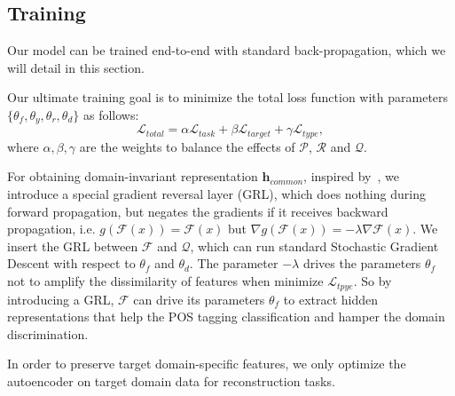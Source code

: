 \documentclass[11pt,letterpaper]{article}
\begin{document}
\subsection{Training}
Our model can be trained end-to-end with standard back-propagation, which we will detail in this section.

Our ultimate training goal is to minimize the total loss function with parameters $\{\theta_f,\theta_y,\theta_r,\theta_d\}$ as follows:
\begin{equation}
\mathcal{L}_{total} =\alpha\mathcal{L}_{task} + \beta\mathcal{L}_{target} + \gamma \mathcal{L}_{type},
\label{eq:minmax}
\end{equation}
where $\alpha,\beta,\gamma$ are the weights to balance the effects of $\mathcal{P}$, $\mathcal{R}$ and $\mathcal{Q}$.

For obtaining domain-invariant representation $\textbf{h}_{common}$, inspired by~\cite{ganin2015unsupervised}, we introduce a special gradient reversal layer (GRL), which does nothing during forward propagation, but negates the gradients if it receives backward propagation, i.e. $g(\mathcal{F}(x))=\mathcal{F}(x)$ but $\nabla g(\mathcal{F}(x))=-\lambda\nabla\mathcal{F}(x)$. We insert the GRL between $\mathcal{F}$ and $\mathcal{Q}$, which can run standard Stochastic Gradient Descent with respect to $\theta_f$ and $\theta_d$. The parameter $-\lambda$ drives the parameters $\theta_f$ not to amplify the dissimilarity of features when minimize $\mathcal{L}_{tpye}$. So by introducing a GRL, $\mathcal{F}$ can drive its parameters $\theta_f$ to extract hidden representations that help the POS tagging classification and hamper the domain discrimination.

In order to preserve target domain-specific features, we only optimize the autoencoder on target domain data for reconstruction tasks.
\end{document}
